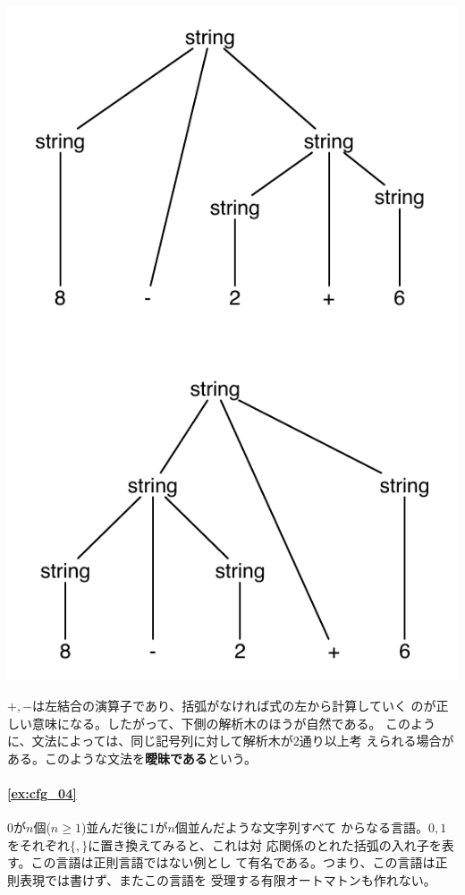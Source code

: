\begin{center}
 \includegraphics[scale=0.8]{figure/ans_cfg_03.pdf}
\end{center}

$+, -$は左結合の演算子であり、括弧がなければ式の左から計算していく
のが正しい意味になる。したがって、下側の解析木のほうが自然である。
このように、文法によっては、同じ記号列に対して解析木が2通り以上考
えられる場合がある。このような文法を{\bfseries 曖昧である}という。

\paragraph{\ref{ex:cfg_04}}

$0$が$n$個($n \geq 1$)並んだ後に$1$が$n$個並んだような文字列すべて
からなる言語。$0, 1$をそれぞれ$\{, \}$に置き換えてみると、これは対
応関係のとれた括弧の入れ子を表す。この言語は正則言語ではない例とし
て有名である。つまり、この言語は正則表現では書けず、またこの言語を
受理する有限オートマトンも作れない。

